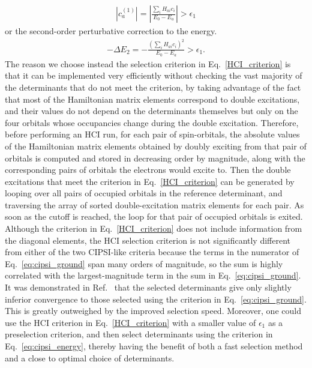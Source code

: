 \documentclass[%
reprint,
 superscriptaddress,
 amsmath,amssymb,
 aps,
]{revtex4-1}
\def\beq{\begin{eqnarray}}
\def\eeq{\end{eqnarray}}
\begin{document}
\beq
\left|c_a^{(1)}\right|=\left|\frac{\sum_i H_{ai}c_i}{E_0-E_a}\right| > \epsilon_1
\label{eq:cipsi_ground}
\eeq
or the second-order perturbative correction to the energy.
\beq
-\Delta E_2=-\frac{\left(\sum_i H_{ai}c_i\right)^2}{E_0-E_a} > \epsilon_1.
\label{eq:cipsi_energy}
\eeq
The reason we choose instead the selection criterion in Eq.~\ref{HCI_criterion} is that it can be implemented
very efficiently without checking the vast majority of the determinants that do not meet the criterion, by taking advantage
of the fact that %
most of the Hamiltonian matrix elements correspond to double excitations, and their values do not depend
on the determinants themselves but only on the four orbitals whose occupancies change during the double excitation.
Therefore, before performing an HCI run, for each pair of spin-orbitals, the absolute values of the Hamiltonian matrix elements
obtained by doubly exciting from that pair of orbitals is computed and stored
in decreasing order by magnitude, along with the corresponding pairs of orbitals the electrons would excite to.
Then the double excitations that meet the criterion in Eq.~\ref{HCI_criterion} can be generated by
looping over all pairs of occupied orbitals in the reference determinant, and
traversing the array of sorted double-excitation matrix elements for each pair.
As soon as the cutoff is reached, the loop for that pair of occupied orbitals is exited.
Although the criterion in Eq.~\ref{HCI_criterion} does not include information from the diagonal elements,
the HCI selection criterion is not significantly different from either of the two CIPSI-like criteria because
the terms in the numerator of Eq.~\ref{eq:cipsi_ground}
span many orders of magnitude, so the sum is highly correlated with the largest-magnitude term in the sum in Eq.~\ref{eq:cipsi_ground}.
It was demonstrated in Ref.~\cite{HolTubUmr-JCTC-16} that the selected determinants give only slightly inferior convergence
to those selected using the criterion in Eq.~\ref{eq:cipsi_ground}.  This is greatly outweighed by the improved selection speed.
Moreover, one could use the HCI criterion in Eq.~\ref{HCI_criterion} with a smaller value of $\epsilon_1$ as a preselection criterion, and then select determinants
using the criterion in Eq.~\ref{eq:cipsi_energy}, thereby having the benefit of both a fast selection method and a
close to optimal choice of determinants.
\end{document}
